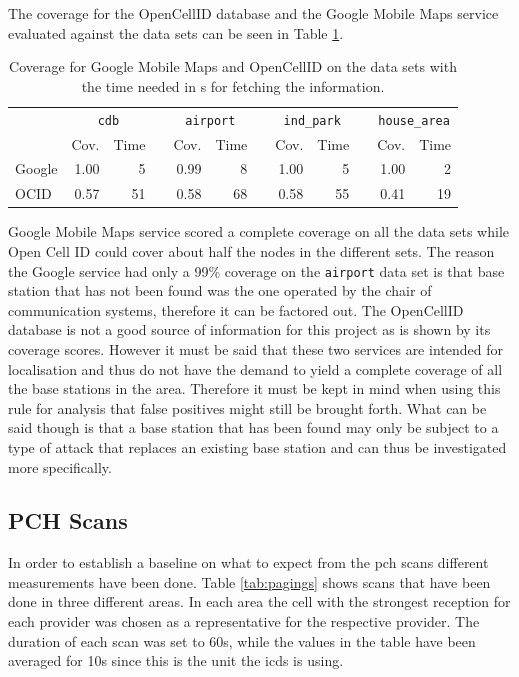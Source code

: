The coverage for the OpenCellID database and the Google Mobile Maps service evaluated against the data sets can be seen in Table \ref{tab:coverage}.
\begin{table}
\centering
\begin{tabular}{lrrcrrcrrcrr}
\toprule
& \multicolumn{2}{c}{\texttt{cdb}} &\phantom{a}& \multicolumn{2}{c}{\texttt{airport}} &\phantom{a} & \multicolumn{2}{c}{\texttt{ind\_park}}&\phantom{a} & \multicolumn{2}{c}{\texttt{house\_area}}\\
\cmidrule{2-3} \cmidrule{5-6} \cmidrule{8-9} \cmidrule{11-12}
&Cov.&Time&	&Cov.&Time&	&Cov.&Time&	&Cov.&Time\\
\midrule
Google&		1.00&5&	&0.99&8&	&1.00&5&	&1.00&2\\
OCID&		0.57&51&	&0.58&68&	&0.58&55&	&0.41&19\\
\bottomrule
\end{tabular}
\caption{Coverage for Google Mobile Maps and OpenCellID on the data sets with the time needed in s for fetching the information.}
\label{tab:coverage}
\end{table}
Google Mobile Maps service scored a complete coverage on all the data sets while Open Cell ID could cover about half the nodes in the different sets.
The reason the Google service had only a 99\% coverage on the \texttt{airport} data set is that base station that has not been found was the one operated by the chair of communication systems, therefore it can be factored out.
The OpenCellID database is not a good source of information for this project as is shown by its coverage scores.
However it must be said that these two services are intended for localisation and thus do not have the demand to yield a complete coverage of all the base stations in the area.
Therefore it must be kept in mind when using this rule for analysis that false positives might still be brought forth.
What can be said though is that a base station that has been found may only be subject to a type of attack that replaces an existing base station and can thus be investigated more specifically.

\subsection{PCH Scans}
In order to establish a baseline on what to expect from the \gls{pch} scans different measurements have been done.
Table \ref{tab:pagings} shows scans that have been done in three different areas.
In each area the cell with the strongest reception for each provider was chosen as a representative for the respective provider.
The duration of each scan was set to 60\;s, while the values in the table have been averaged for 10\;s since this is the unit the \gls{icds} is using.

